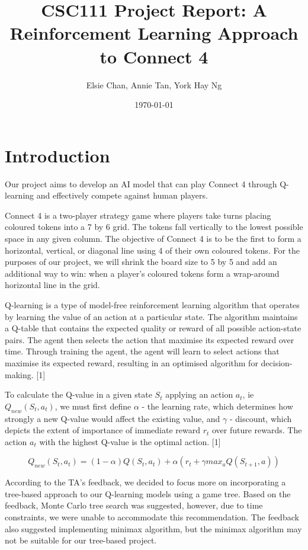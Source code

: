 \documentclass{article}
\title{CSC111 Project Report: A Reinforcement Learning Approach to Connect 4}
\author{Elsie Chan, Annie Tan, York Hay Ng}
\date{\today}
\begin{document}
\maketitle

\section{Introduction}

\par Our project aims to develop an AI model that can play Connect 4 through Q-learning and effectively compete against human players.

Connect 4 is a two-player strategy game where players take turns placing coloured tokens into a 7 by 6 grid. The tokens fall vertically to the lowest possible space in any given column. The objective of Connect 4 is to be the first to form a horizontal, vertical, or diagonal line using 4 of their own coloured tokens. For the purposes of our project, we will shrink the board size to 5 by 5 and add an additional way to win: when a player’s coloured tokens form a wrap-around horizontal line in the grid.

Q-learning is a type of model-free reinforcement learning algorithm that operates by learning the value of an action at a particular state. The algorithm maintains a Q-table that contains the expected quality or reward of all possible action-state pairs. The agent then selects the action that maximise its expected reward over time. Through training the agent, the agent will learn to select actions that maximise its expected reward, resulting in an optimised algorithm for decision-making. [1]

To calculate the Q-value in a given state $S_{t}$ applying an action $a_{t}$, ie $Q_{new}(S_{t},a_{t})$, we must first define $\alpha$ - the learning rate, which determines how strongly a new Q-value would affect the existing value, and $\gamma$ - discount, which depicts the extent of importance of immediate reward $r_{t}$ over future rewards. The action $a_{t}$ with the highest Q-value is the optimal action. [1]

$$Q_{new}(S_{t},a_{t}) = (1 - \alpha)Q(S_{t},a_{t}) + \alpha(r_{t} + \gamma max_{a}Q(S_{t+1},a))$$

According to the TA's feedback, we decided to focus more on incorporating a tree-based approach to our Q-learning models using a game tree. Based on the feedback, Monte Carlo tree search was suggested, however, due to time constraints, we were unable to accommodate this recommendation. The feedback also suggested implementing minimax algorithm, but the minimax algorithm may not be suitable for our tree-based project.
\end{document}
